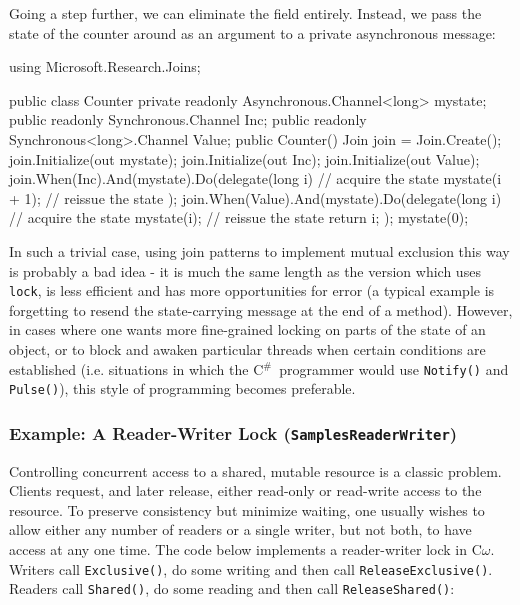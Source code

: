\documentclass{article}
\newcommand{\comega}{\texorpdfstring{\mbox{C$\omega$}}{C{omega}}}
\newcommand{\csharp}{\texorpdfstring{\mbox{C$^\#$}}{C\#}}
\newcommand{\sample}[1]{\texorpdfstring{{(\texttt{Samples{\symbol{92}}#1})}}{}}
\begin{document}
Going a step further, we can eliminate the field entirely. Instead, we
pass the state of the counter around as an argument to a private
asynchronous message:

\begin{lstcsharp}
  using Microsoft.Research.Joins;

  public class Counter {
    private readonly Asynchronous.Channel<long> mystate;
    public readonly Synchronous.Channel Inc;
    public readonly Synchronous<long>.Channel Value;
    public Counter() {
      Join join = Join.Create();
      join.Initialize(out mystate);
      join.Initialize(out Inc);
      join.Initialize(out Value);
      join.When(Inc).And(mystate).Do(delegate(long i)
      {  // acquire the state
        mystate(i + 1); // reissue the state
      });
      join.When(Value).And(mystate).Do(delegate(long i)
      { // acquire the state
        mystate(i); // reissue the state
        return i; 
      });
      mystate(0);
    }
  }
\end{lstcsharp}

In such a trivial case, using join patterns to implement mutual
exclusion this way is probably a bad idea - it is much the same length
as the version which uses \verb|lock|, is less efficient and has more
opportunities for error (a typical example is forgetting to resend the
state-carrying message at the end of a method). However, in cases
where one wants more fine-grained locking on parts of the state of an
object, or to block and awaken particular threads when certain
conditions are established (i.e. situations in which the \csharp\
programmer would use \verb|Notify()| and \verb|Pulse()|), this style
of programming becomes preferable.

\subsubsection{Example: A Reader-Writer Lock \sample{ReaderWriter}}

Controlling concurrent access to a shared, mutable resource is a
classic problem. Clients request, and later release, either read-only
or read-write access to the resource. To preserve consistency but
minimize waiting, one usually wishes to allow either any number of
readers or a single writer, but not both, to have access at any one
time. The code below implements a reader-writer lock in
\comega. Writers call \verb|Exclusive()|, do some writing and then
call \verb|ReleaseExclusive()|. Readers call \verb|Shared()|, do some
reading and then call \verb|ReleaseShared()|:
\end{document}
